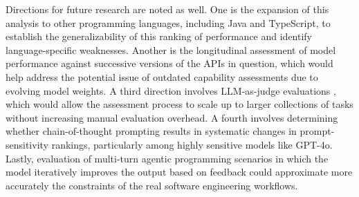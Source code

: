 \documentclass[conference]{IEEEtran}
\begin{document}
Directions for future research are noted as well. One is the expansion of this analysis to other programming languages, including Java and TypeScript, to establish the generalizability of this ranking of performance and identify language-specific weaknesses. Another is the longitudinal assessment of model performance against successive versions of the APIs in question, which would help address the potential issue of outdated capability assessments due to evolving model weights. A third direction involves LLM-as-judge evaluations \cite{zheng2023judging}, which would allow the assessment process to scale up to larger collections of tasks without increasing manual evaluation overhead. A fourth involves determining whether chain-of-thought prompting \cite{wei2022cot} results in systematic changes in prompt-sensitivity rankings, particularly among highly sensitive models like GPT-4o. Lastly, evaluation of multi-turn agentic programming scenarios \cite{kimiteam2025k2} in which the model iteratively improves the output based on feedback could approximate more accurately the constraints of the real software engineering workflows.

\balance
\end{document}
